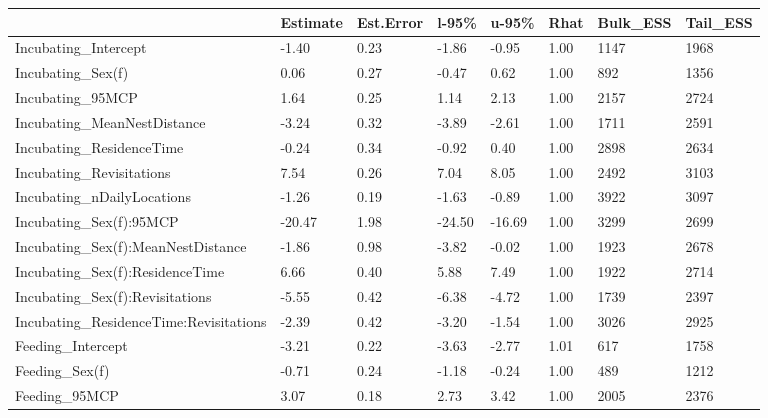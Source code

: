 \begin{table}[H]
\footnotesize{
\begin{center}
\begin{tabular}{| p{5.3cm} | p{1.1cm} | p{1.1cm} | p{0.85cm} | p{0.95cm} | p{0.5cm} | p{1.3cm} | p{1.2cm} |}
\hline
& \textbf{Estimate} & \textbf{Est.Error} & \textbf{l-95\%} & \textbf{u-95\%} & \textbf{Rhat} & \textbf{Bulk\_ESS} & \textbf{Tail\_ESS} \\
\hline
\footnotesize{Incubating\_Intercept} & -1.40 & 0.23 & -1.86 & -0.95 & 1.00 & 1147 & 1968 \\ 
\hline
\footnotesize{Incubating\_Sex(f)} & 0.06 & 0.27 & -0.47 & 0.62 & 1.00 & 892 & 1356 \\ 
\hline
\footnotesize{Incubating\_95MCP} & 1.64 & 0.25 & 1.14 & 2.13 & 1.00 & 2157 & 2724 \\ 
\hline
\footnotesize{Incubating\_MeanNestDistance} & -3.24 & 0.32 & -3.89 & -2.61 & 1.00 & 1711 & 2591 \\ 
\hline
\footnotesize{Incubating\_ResidenceTime} & -0.24 & 0.34 & -0.92 & 0.40 & 1.00 & 2898 & 2634 \\ 
\hline
\footnotesize{Incubating\_Revisitations} & 7.54 & 0.26 & 7.04 & 8.05 & 1.00 & 2492 & 3103 \\ 
\hline
\footnotesize{Incubating\_nDailyLocations} & -1.26 & 0.19 & -1.63 & -0.89 & 1.00 & 3922 & 3097 \\ 
\hline
\footnotesize{Incubating\_Sex(f):95MCP} & -20.47 & 1.98 & -24.50 & -16.69 & 1.00 & 3299 & 2699 \\ 
\hline
\footnotesize{Incubating\_Sex(f):MeanNestDistance} & -1.86 & 0.98 & -3.82 & -0.02 & 1.00 & 1923 & 2678 \\ 
\hline
\footnotesize{Incubating\_Sex(f):ResidenceTime} & 6.66 & 0.40 & 5.88 & 7.49 & 1.00 & 1922 & 2714 \\ 
\hline
\footnotesize{Incubating\_Sex(f):Revisitations} & -5.55 & 0.42 & -6.38 & -4.72 & 1.00 & 1739 & 2397 \\ 
\hline
\footnotesize{Incubating\_ResidenceTime:Revisitations} & -2.39 & 0.42 & -3.20 & -1.54 & 1.00 & 3026 & 2925 \\ 
\hline
\footnotesize{Feeding\_Intercept} & -3.21 & 0.22 & -3.63 & -2.77 & 1.01 & 617 & 1758 \\
\hline
\footnotesize{Feeding\_Sex(f)} & -0.71 & 0.24 & -1.18 & -0.24 & 1.00 & 489 & 1212 \\ 
\hline
\footnotesize{Feeding\_95MCP} & 3.07 & 0.18 & 2.73 & 3.42 & 1.00 & 2005 & 2376 \\ 

\end{tabular}
\end{center}}
\end{table}

